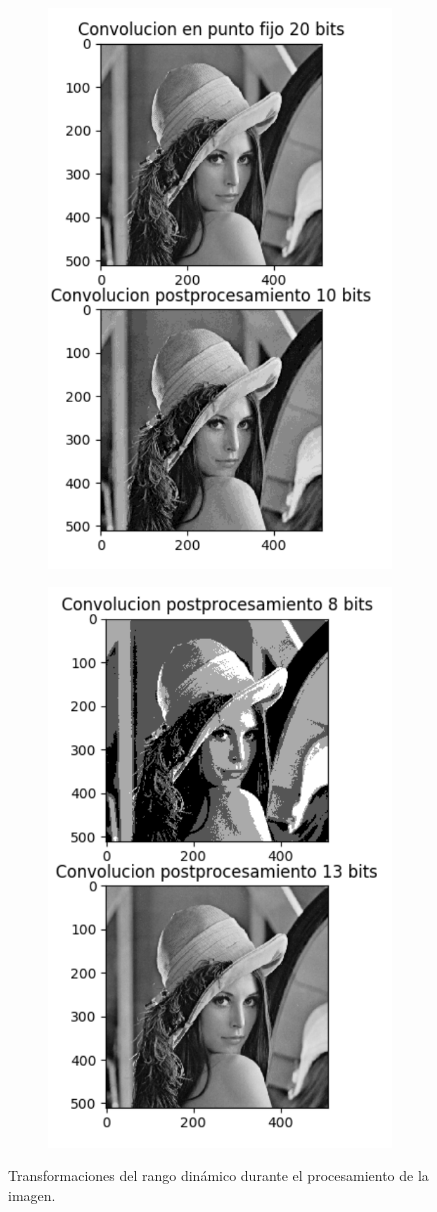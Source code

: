 \documentclass[a4paper]{article}
\begin{document}
\begin{figure}[H]
  \centering
   \begin{subfigure}{0.5\textwidth}
     \includegraphics[width=0.47\linewidth]{posprocesanto1}
   \end{subfigure}%
   \begin{subfigure}{0.5\textwidth}
   \centering
     \includegraphics[width=0.47\linewidth]{posprocesanto2}
   \end{subfigure}%
  \caption{Transformaciones del rango dinámico durante el procesamiento de la imagen.}
  \label{prepro2}
\end{figure}
\end{document}
